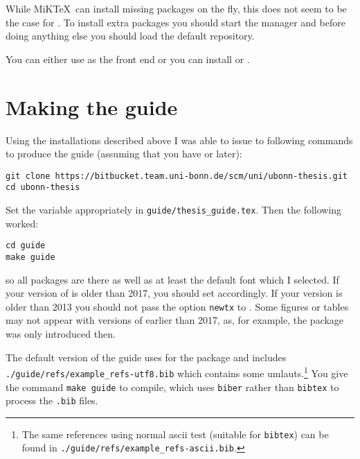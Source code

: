 While MiK\TeX\ can install missing packages on the fly, this does not
seem to be the case for \TeXLive. To install extra packages you should
start the \TeXLive manager and before doing anything else you should
load the default repository.

You can either use \TeXworks as the front end or you can install
\TeXstudio or \TeXmaker.


\section{Making the guide}%
\label{sec:app:guide}

Using the installations described above I was able to issue to following commands to
produce the guide (assuming that you have  or later):
\begin{verbatim}
git clone https://bitbucket.team.uni-bonn.de/scm/uni/ubonn-thesis.git
cd ubonn-thesis
\end{verbatim}
Set the  variable appropriately in \texttt{guide/thesis\_guide.tex}.
Then the following worked:
\begin{verbatim}
cd guide
make guide
\end{verbatim}
so all packages are there as well as at least the default font which I selected.
If your version of \TeXLive is older than 2017, you should set  accordingly.
If your version is older than 2013 you should not pass the option \texttt{newtx} to .
Some figures or tables may not appear with versions of \TeXLive earlier than 2017,
as, for example, the  package was only introduced then.

The default version of the guide uses  for the
 package and includes\\
\texttt{./guide/refs/example\_refs-utf8.bib} which contains some umlauts.\footnote{%
The same references using normal ascii test (suitable for \texttt{bibtex}) can be found in
\texttt{./guide/refs/example\_refs-ascii.bib}.}
You give the command \texttt{make guide} to compile, which uses \texttt{biber} rather than
\texttt{bibtex} to process the \texttt{.bib} files.

